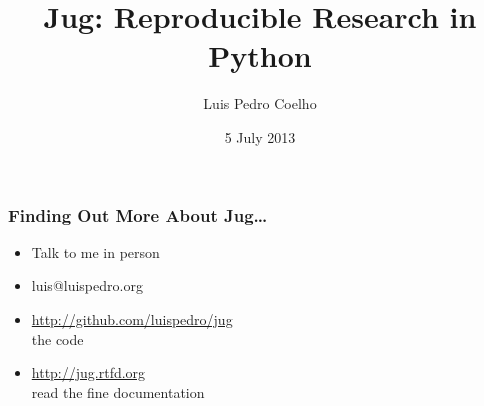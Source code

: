 \documentclass{beamer}
\title[Jug]{Jug: Reproducible Research in Python}
\author[luis@luispedro.org]{Luis Pedro Coelho}
\institute{EMBL}
\date{5 July 2013}
\begin{document}
\frame{\titlepage}


\begin{frame}[fragile]
\frametitle{Finding Out More About Jug\ldots}
\begin{itemize}
\item Talk to me \alert{in person}
\item luis@luispedro.org
\item \url{http://github.com/luispedro/jug}\\the code
\item \url{http://jug.rtfd.org}\\read the fine documentation
\end{itemize}

\end{frame}
\end{document}
